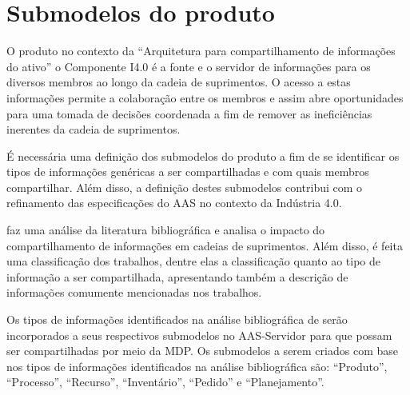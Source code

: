 \section{Submodelos do produto}

O produto no contexto da ``Arquitetura para compartilhamento de informações do ativo'' o Componente I4.0 é a fonte e o servidor de informações para os diversos membros ao longo da cadeia de suprimentos. O acesso a estas informações permite a colaboração entre os membros e assim abre oportunidades para uma tomada de decisões coordenada a fim de remover as ineficiências inerentes da cadeia de suprimentos.

É necessária uma definição dos submodelos do produto a fim de se identificar os tipos de informações genéricas a ser compartilhadas e com quais membros compartilhar. Além disso, a definição destes submodelos contribui com o refinamento das especificações do AAS no contexto da Indústria 4.0.

 faz uma análise da literatura bibliográfica e analisa o impacto do compartilhamento de informações em cadeias de suprimentos. Além disso, é feita uma classificação dos trabalhos, dentre elas a classificação quanto ao tipo de informação a ser compartilhada, apresentando também a descrição de informações comumente mencionadas nos trabalhos.

Os tipos de informações identificados na análise bibliográfica de  serão incorporados a seus respectivos submodelos no AAS-Servidor para que possam ser compartilhadas por meio da MDP. Os submodelos a serem criados com base nos tipos de informações identificados na análise bibliográfica são: ``Produto'', ``Processo'', ``Recurso'', ``Inventário'', ``Pedido'' e ``Planejamento''.



